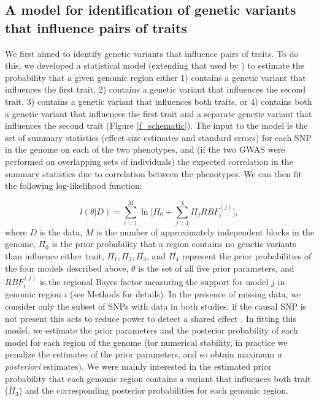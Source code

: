 \documentclass[11pt,titlepage]{article}
\begin{document}
\subsection{A model for identification of genetic variants that influence pairs of traits}

We first aimed to identify genetic variants that influence pairs of traits. 
To do this, we developed a statistical model (extending that used by \citet{Giambartolomei:2014aa}) to estimate the probability that a given genomic region either 1) contains a genetic variant that influences the first trait, 2) contains a genetic variant that influences the second trait, 3) contains a genetic variant that influences both traits, or 4) contains both a genetic variant that influences the first trait and a separate genetic variant that influences the second trait (Figure \ref{f_schematic}). 
The input to the model is the set of summary statistics (effect size estimates and standard errors) for each SNP in the genome on each of the two phenotypes, and (if the two GWAS were performed on overlapping sets of individuals) the expected correlation in the summary statistics due to correlation between the phenotypes.  
We can then fit the following log-likelihood function:


\begin{equation}
l(\theta | D) = \sum \limits_{i = 1}^M \ln \bigg[ \Pi_0 + \sum \limits_{j = 1}^4 \Pi_j RBF_i^{(j)} \bigg],
\end{equation}
\noindent where $D$ is the data, $M$ is the number of approximately independent blocks in the genome, $\Pi_0$ is the prior probability that a region contains no genetic variants than influence either trait, $\Pi_1, \Pi_2, \Pi_3$, and $\Pi_4$ represent the prior probabilities of the four models described above, $\theta$ is the set of all five prior parameters, and $RBF_i^{(j)}$ is the regional Bayes factor measuring the support for model $j$ in genomic region $i$ (see Methods for details). 
In the presence of missing data, we consider only the subset of SNPs with data in both studies; if the causal SNP is not present this acts to reduce power to detect a shared effect \citep{Giambartolomei:2014aa}. 
In fitting this model, we estimate the prior parameters and the posterior probability of each model for each region of the genome (for numerical stability, in practice we penalize the estimates of the prior parameters, and so obtain maximum \emph{a posteriori} estimates). 
We were mainly interested in the estimated prior probability that each genomic region contains a variant that influences both trait ($\hat \Pi_3$) and the corresponding posterior probabilities for each genomic region.
\end{document}
